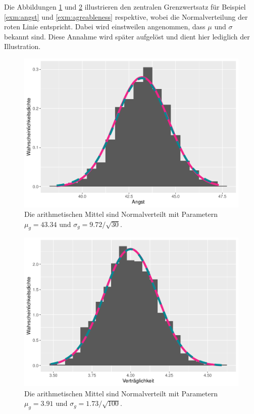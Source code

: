 \documentclass[
]{book}
\theoremstyle{definition}
\theoremstyle{definition}
\theoremstyle{definition}
\theoremstyle{definition}
\theoremstyle{remark}
\begin{document}
Die Abbildungen \ref{fig:exm-angst-normal-approx} und \ref{fig:exm-agreableness-normal-approx} illustrieren den zentralen Grenzwertsatz für Beispiel \ref{exm:angst} und \ref{exm:agreableness} respektive, wobei die Normalverteilung der roten Linie entspricht. Dabei wird einstweilen angenommen, dass \(\mu\) und \(\sigma\) bekannt sind. Diese Annahme wird später aufgelöst und dient hier lediglich der Illustration.

\begin{figure}
\centering
\includegraphics{aps_statistik1_files/figure-latex/exm-angst-normal-approx-1.pdf}
\caption{\label{fig:exm-angst-normal-approx}Die arithmetischen Mittel sind Normalverteilt mit Parametern \(\mu_g = 43.34\) und \(\sigma_g = 9.72 / \sqrt{30}\).}
\end{figure}

\begin{figure}
\centering
\includegraphics{aps_statistik1_files/figure-latex/exm-agreableness-normal-approx-1.pdf}
\caption{\label{fig:exm-agreableness-normal-approx}Die arithmetischen Mittel sind Normalverteilt mit Parametern \(\mu_g = 3.91\) und \(\sigma_g = 1.73 / \sqrt{100}\).}
\end{figure}
\end{document}
